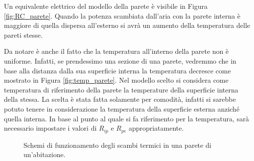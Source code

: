 \documentclass[laurea,oneside,11pt]{USiena_tesiLM}
\begin{document}
Un equivalente elettrico del modello della parete è visibile in Figura \ref{fig:RC_parete}.
Quando la potenza scambiata dall'aria con la parete  interna è maggiore di quella dispersa all'esterno si avrà un aumento della temperatura delle pareti stesse.

Da notare è anche il fatto che la temperatura all'interno della parete non è uniforme. Infatti, se prendessimo una sezione di una parete, vedremmo che in base alla distanza dalla sua superficie interna la temperatura decresce come mostrato in Figura \ref{fig:temp_parete}.  Nel modello scelto si considera come temperatura di riferimento della parete la temperature della superficie interna della stessa. La scelta è stata fatta solamente per comodità, infatti si sarebbe potuto tenere in considerazione la temperatura della superficie esterna anziché quella interna. In base al punto al quale si fa riferimento per la temperatura, sarà necessario impostare  i valori di $R_{ip}$ e $R_{pe}$ appropriatamente.   

 \begin{figure}[!ht]
 \centering
 \hspace{5mm}
 \caption{Schemi di funzionamento degli scambi termici in una parete di un'abitazione.}
 \end{figure}
\end{document}
